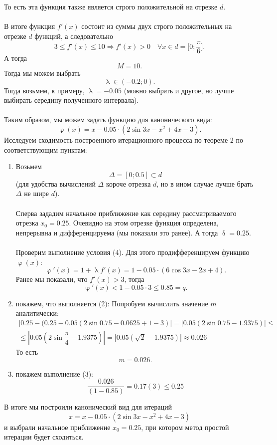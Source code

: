\documentclass[a4paper, 12pt]{article}
\renewcommand{\leq}{\leqslant}
\renewcommand{\delta}{\updelta}
\renewcommand{\varphi}{\upvarphi}
\renewcommand{\lambda}{\uplambda}
\begin{document}
\begin{enumerate}
		То есть эта функция также является строго положительной на отрезке $d$. 
		\\\\
		В итоге функция $f'(x)$ состоит из суммы двух строго положительных на отрезке $d$ функций, а следовательно $$3 \leq f'(x) \leq 10 \Rightarrow f'(x) > 0\quad \forall x \in d=\Big[0; \dfrac\pi6\Big].$$
		А тогда $$M = 10.$$
		Тогда мы можем выбрать $$\lambda \in (-0.2; 0).$$ Тогда возьмем, к примеру, $\lambda = -0.05$ (можно выбрать и другое, но лучше выбирать середину полученного интервала).\\\\
		Таким образом, мы можем задать функцию для канонического вида: $$\varphi(x) = x - 0.05 \cdot (2\sin 3x - x^2 + 4x - 3).$$
		Исследуем сходимость построенного итерационного процесса по теореме 2 по соответствующим пунктам:
		\begin{enumerate}
			\item Возьмем $$\Delta = [0; 0.5]\subset d$$ (для удобства вычислений $\Delta$ короче отрезка $d$, но в ином случае лучше брать $\Delta$ не шире $d$).\\\\
			Сперва зададим начальное приближение как середину рассматриваемого отрезка $x_0 = 0.25$. Очевидно на этом отрезке функция определена, непрерывна и дифференцируема (мы показали это ранее). А тогда $\delta = 0.25$.\\\\
			Проверим выполнение условия (4). Для этого продифференцируем функцию $\varphi(x)$:
			$$\varphi'(x) = 1+\lambda f'(x) = 1 - 0.05 \cdot (6\cos 3x - 2x + 4).$$ Ранее мы показали, что $f'(x) > 3$, тогда $$\varphi'(x) < 1 - 0.05 \cdot 3 \leq 0.85 = q.$$
			\item покажем, что выполняется (2):
			Попробуем вычислить значение $m$ аналитически:
			\begin{multline*}
				| 0.25 - (0.25 - 0.05(2\sin0.75 - 0.0625 + 1 -3 ) | = |0.05(2\sin0.75 -1.9375)|\leq\\ \leq |0.05(2\sin\dfrac\pi4 -1.9375)|=|0.05(\sqrt2 - 1.9375)| \approx0.026
			\end{multline*}
			То есть $$m = 0.026.$$
			\item покажем выполнение (3):
			$$\dfrac{0.026}{(1-0.85)}=0.17(3) \leq 0.25$$
		\end{enumerate}
		В итоге мы построили канонический вид для итераций $$x = x - 0.05 \cdot (2\sin 3x - x^2 + 4x - 3)$$
		и выбрали начальное приближение $x_0=0.25$, при котором метод простой итерации будет сходиться.
		

\end{enumerate}
\end{document}
